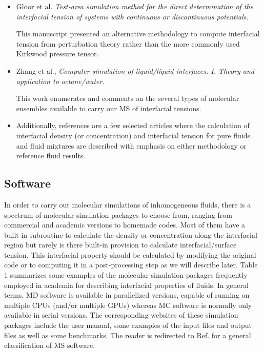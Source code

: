 \documentclass[9pt,bestpractices]{livecoms}
\begin{document}
\begin{itemize}
\item Gloor et al. \textit{Test-area simulation method for the direct determination of the interfacial tension of systems with continuous or discontinuous potentials.} \citep{gloor2005}
  
  This manuscript presented an alternative methodology to compute interfacial tension from perturbation theory rather than the more commonly used Kirkwood pressure tensor.

\item Zhang et al., \textit{Computer simulation of liquid/liquid interfaces. I. Theory and application to octane/water.} \citep{zhang1995}

  This work enumerates and comments on the several types of molecular ensembles available to carry our MS of interfacial tensions.

\item Additionally, references \citep{walton1983,chapela1977,trokhymchuk1999,mecke1997,mecke1999,duque2004,errington2007,stephan2019} are a few
  selected articles where the calculation of interfacial density (or
  concentration) and interfacial tension for pure fluids and fluid mixtures are
  described with emphasis on either methodology or reference fluid results. 

\end{itemize}

\subsection{Software}

In order to carry out molecular simulations of inhomogeneous fluids, there is
a spectrum of molecular simulation packages to choose from, ranging from commercial and academic
versions to homemade codes. Most of them have a built-in subroutine to
calculate the density or concentration along the interfacial region but rarely
is there built-in provision to calculate interfacial/surface tension. This
interfacial property should be calculated by modifying the original code or to
computing it in a post-processing step as we will describe later. Table
1 summarizes some examples of the molecular simulation packages frequently
employed in academia for describing interfacial properties of fluids. In
general terms, MD software is available in parallelized versions, capable of
running on multiple CPUs (and/or multiple GPUs) whereas MC software is normally
only available in serial versions. The corresponding websites of these
simulation packages include the user manual, some examples of the input
files and output files as well as some benchmarks. The reader is redirected to
Ref. \citep{wiki} for a general classification of MS software. 
\end{document}

